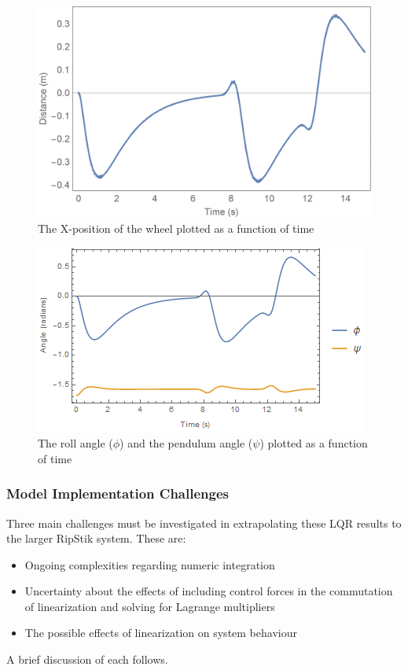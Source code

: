\begin{figure}[!htb]
	\centering
	\includegraphics[width=\linewidth]{wheelperturbdistance.jpg}
	\endminipage\hspace{1em}%
	\caption{The X-position of the wheel plotted as a function of time}\label{fig:wheelperturbdistance}
\end{figure}

\begin{figure}[!htb]
	\centering
	\includegraphics[width=\linewidth]{wheelperturbphipsi.png}
	\endminipage\hspace{1em}%
	\caption{The roll angle ($\phi$) and the pendulum angle ($\psi$) plotted as a function of time}\label{fig:wheelperturbphipsi}
\end{figure}

\par
\subsubsection{Model Implementation Challenges}
Three main challenges must be investigated in extrapolating these LQR results to the larger RipStik system. These are:
\begin{itemize}
	\item Ongoing complexities regarding numeric integration
	\item Uncertainty about the effects of including control forces in the commutation of linearization and solving for Lagrange multipliers
	\item The possible effects of linearization on system behaviour
\end{itemize}
A brief discussion of each follows.
